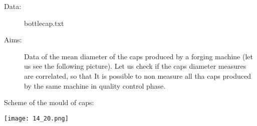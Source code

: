 

\begin{frame} 
 
\begin{description}
	\item[Data:] bottlecap.txt\\
	\item[Aims:] Data of the mean diameter of the caps produced by a forging machine (let us see the following picture).
 Let us check if the caps diameter measures are correlated, so that It is possible to non measure all tha caps produced by the same machine in quality control phase.
				\begin{itemize}\end{itemize}

\end{description}
 
\end{frame}

\begin{frame}
Scheme of the mould of caps:
\vspace{.3cm}
	\begin{center}
		\texttt{[image: 14\_20.png]}
	\end{center}
\end{frame}

